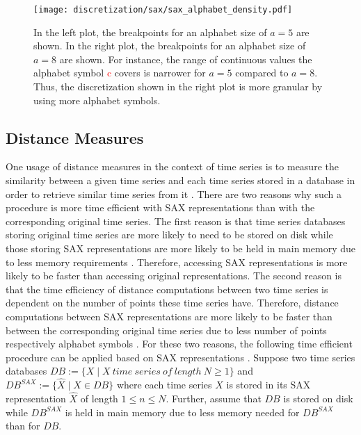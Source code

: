 \begin{figure}[htb]
\centering
\texttt{[image: discretization/sax/sax\_alphabet\_density.pdf]}
\caption[Symbolic Aggregate Approximation - Effect of Alphabet Size]{In the left plot, the breakpoints for an alphabet size of $a = 5$ are shown. In the right plot, the breakpoints for an alphabet size of $a = 8$ are shown. For instance, the range of continuous values the alphabet symbol \textcolor{red}{c} covers is narrower for $a = 5$ compared to $a = 8$. Thus, the discretization shown in the right plot is more granular by using more alphabet symbols.}
\label{fig:SAX_alphabet_size}
\end{figure}
\subsection*{Distance Measures}
One usage of distance measures in the context of time series is to measure the similarity between a given time series and each time series stored in a database in order to retrieve similar time series from it \cite{Survey_Esling}. There are two reasons why such a procedure is more time efficient with \ac{SAX} representations than  with the corresponding original time series. \newline
The first reason is that time series databases storing original time series are more likely to need to be stored on disk while those storing \ac{SAX} representations are more likely to be held in main memory due to less memory requirements \cite{SAX_Lin}. Therefore, accessing \ac{SAX} representations is more likely to be faster than accessing original representations. \newline
The second reason is that the time efficiency of distance computations between two time series is dependent on the number of points these time series have. Therefore, distance computations between \ac{SAX} representations are more likely to be faster than between the corresponding original time series due to less number of points respectively alphabet symbols \cite{SAX_Lin}. \newline
For these two reasons, the following time efficient procedure can be applied based on \ac{SAX} representations \cite{SAX_Lin, Faloutsos_Bounding_Lemma}. \newline
Suppose two time series databases $DB := \{X \mid X \ time \ series \ of \ length \ N \geq 1\}$ and $DB^{SAX} := \{\hat{X} \mid X \in DB\}$ where each time series $X$ is stored in its \ac{SAX} representation $\hat{X}$ of length $ 1 \leq n \leq N$.  Further, assume that $DB$ is stored on disk while $DB^{SAX}$ is held in main memory due to less memory needed for $DB^{SAX}$ than for $DB$. \newline
